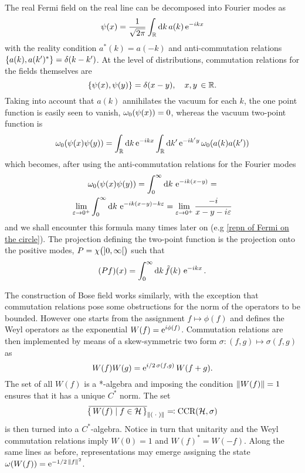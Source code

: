 \begin{example}
The real Fermi field on the real line
can be decomposed into Fourier modes as
\[
\psi(x)=\frac{1}{\sqrt{2\pi}}\int_{\mathbb{R}}\textrm{d} k\,a(k)\operatorname{e}^{-ikx}
\]
with the reality condition $a^*(k)=a(-k)$ and anti-commutation
relations $\{a(k),a(k')^*\}=\delta(k-k')$. 
At the level of distributions, commutation relations for the 
fields themselves are 
\[
\{\psi(x),\psi(y)\}=\delta(x-y),\quad x,y\,\in\mathbb{R}.
\]
Taking into account
that $a(k)$ annihilates the vacuum for each $k$, the one point
function is easily seen to vanish, $\omega_0(\psi(x))=0$, whereas  
the vacuum two-point function is 
\[
\omega_0(\psi(x)\psi(y))=\int_{\mathbb{R}} \textrm{d} k \operatorname{e}^{-ikx} \int_{\mathbb{R}}\textrm{d} k'
\operatorname{e}^{-ik'y} \omega_0(a(k)a(k'))
\]
which becomes, after using the anti-commutation relations
for the Fourier modes
\begin{multline}
\label{vacuum2}
\omega_0(\psi(x)\psi(y))=\int_0^{\infty}\textrm{d} k\,\operatorname{e}^{-ik(x-y)}=\\
\lim_{\varepsilon\to 0^+}\int_0^{\infty}\textrm{d} k\,
\operatorname{e}^{-ik(x-y)-k\varepsilon}
=\lim_{\varepsilon\to 0^+}\frac{-i}{x-y-i\varepsilon}
\end{multline}
and we shall encounter this formula many times later on 
(e.g \ref{repn of Fermi on the circle}). The projection 
defining the two-point function is the projection 
onto the positive modes, $P=\chi\big(\mathopen{]}0,\infty\mathclose{[}\big)$
such that 
\[
(Pf)(x)=\int_0^{\infty}\textrm{d} k\, \tilde{f}(k)\,\operatorname{e}^{-ikx}.
\]
\end{example}

\bigskip
The construction of Bose field works similarly, with the exception
that commutation relations pose some obstructions for the norm
of the operators to be bounded. However one starts from the 
assignment $f\mapsto \phi(f)$ and defines the Weyl operators
as the exponential $W(f)=\operatorname{e}^{i\phi(f)}$. Commutation relations
are then implemented by means of a skew-symmetric two form
$\sigma\colon (f,g)\mapsto\sigma(f,g)$ as
\[
W(f)W(g)=\operatorname{e}^{i/2\,\sigma(f,g)}W(f+g).
\]
The set of all $W(f)$ is a *-algebra and imposing the condition
$\lVert W(f)\rVert=1$ ensures that it has a unique $C^*$ norm. The set
\[
{}\mkern3mu\overline{\mkern-3mu\set{W(f)\mid f\in \mathcal{H}}}_{\lVert(\;{\cdot}\;)\rVert}
\eqqcolon \text{CCR}(\mathcal{H},\sigma)
\]
is then turned into a $C^*$-algebra. Notice in turn that unitarity 
and the Weyl commutation relations imply $W(0)=1$ and $W(f)^*=
W(-f)$. Along the same lines as before, representations may emerge
assigning the state $\omega(W(f))=\operatorname{e}^{-1/2\,{\lVert f\rVert}^2}$.